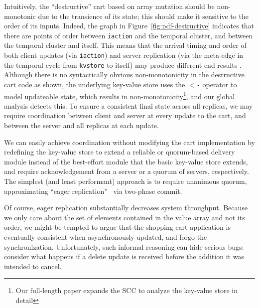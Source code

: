 Intuitively, the ``destructive'' cart based on
array mutation should be non-monotonic due to the transience of its state; this should make it sensitive to the order
of its inputs.
Indeed, the graph in Figure~\ref{fig:pdf-destructive}
indicates that there are
points of order between \texttt{iaction} and the temporal cluster,
and between the temporal cluster and itself.  
This means that the arrival 
timing and order of both client updates (via \texttt{iaction}) and
server replication (via the meta-edge in the temporal cycle from 
\texttt{kvstore} to itself) may produce different
end results .  Although there is no syntactically obvious non-monotonicity in the destructive
cart code as shown, the underlying key-value store uses the \texttt{$<$-} operator to model updateable state, which results in non-monotonicity\footnote{Our full-length paper expands the SCC to analyze the
key-value store in detail}, 
and our global analysis detects this.
To ensure a consistent final state across all replicas, we may require coordination
between client and server at every update to the cart, and between the 
server and all replicas at each update.  

We can easily achieve coordination without modifying the cart implementation
by redefining the key-value store to extend
a reliable or quorum-based delivery module instead of the best-effort module
that the basic key-value store extends, and require acknowledgement from a server or a quorum of servers, respectively.
The simplest (and least performant) approach is to require unanimous quorum,
approximating ``eager replication''~\cite{dangers} via two-phase commit.

Of course, eager replication substantially decreases system throughput.  
Because we only care about the set of elements contained in the value array
and not its order, we might be tempted to argue that 
the shopping cart application is eventually consistent
when asynchronously updated, and forgo the synchronization.  Unfortunately, such informal reasoning can
hide serious bugs: consider what happens if a delete update is received
before the addition it was intended to cancel.



